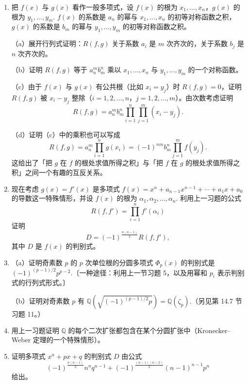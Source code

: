 \begin{enumerate}
（b）设 \(R'\) 表示 \(R\) 的代数余子式矩阵（如第 11.4 节定理 30 中那样），故 \(R'R = R(f,g)I\)，其中 \(I\) 是单位矩阵。把上面的矩阵方程两边左乘 \(R'\)，并令所得列矩阵最下面的一个分量相等，证明存在多项式 \(r(x), s(x) \in F[x]\) 使 \(R(f,g) = r(x)f(x)+s(x)g(x)\)，即两个多项式的结式是这两个多项式在 \(F[x]\) 中的线性组合。

\item 把 \(f(x)\) 与 \(g(x)\) 看作一般多项式，设 \(f(x)\) 的根为 \(x_1, \ldots, x_n\)，\(g(x)\) 的根为 \(y_1, \ldots, y_m\). \(f(x)\) 的系数是 \(a_n\) 的幂与 \(x_1, \ldots, x_n\) 的初等对称函数之积，\(g(x)\) 的系数是 \(b_m\) 的幂与 \(y_1, \ldots, y_m\) 的初等对称函数之积。

（a）展开行列式证明：\(R(f,g)\) 关于系数 \(a_i\) 是 \(m\) 次齐次的，关于系数 \(b_j\) 是 \(n\) 次齐次的。

（b）证明 \(R(f,g)\) 等于 \(a_n^mb_m^n\) 乘以 \(x_1, \ldots, x_n\) 与 \(y_1, \ldots, y_m\) 的一个对称函数。

（c）由于 \(f(x)\) 与 \(g(x)\) 有公共根（比如 \(x_i = y_j\)）时 \(R(f,g) = 0\)，证明 \(R(f,g)\) 被 \(x_i-y_j\) 整除（\(i = 1, 2, \ldots, n\)，\(j = 1, 2, \ldots, m\)）。由次数考虑证明
\[
R(f,g) = a_n^mb_m^n\prod_{i=1}^{n}\prod_{j=1}^{m}(x_i-y_j).
\]

（d）证明（c）中的乘积也可以写成
\[
R(f,g) = a_n^m\prod_{i=1}^{n}g(x_i) = (-1)^{nm}b_m^n\prod_{j=1}^{m}f(y_j).
\]
这给出了「把 \(g\) 在 \(f\) 的根处求值所得之积」与「把 \(f\) 在 \(g\) 的根处求值所得之积」之间一个有趣的互反关系。

\item 现在考虑 \(g(x) = f'(x)\) 是多项式 \(f(x) = x^n+a_{n-1}x^{n-1}+\cdots+a_1x+a_0\) 的导数这一特殊情形，并设 \(f(x)\) 的根为 \(\alpha_1, \alpha_2, \ldots, \alpha_n\). 利用上一习题的公式
\[
R(f,f') = \prod_{i=1}^{n}f'(\alpha_i)
\]
证明
\[
D = (-1)^{\frac{n(n-1)}{2}}R(f,f'),
\]
其中 \(D\) 是 \(f(x)\) 的判别式。

\item （a）证明奇素数 \(p\) 的 \(p\) 次单位根的分圆多项式 \(\Phi_p(x)\) 的判别式是 \((-1)^{(p-1)/2}p^{p-2}\).〔一种途径：利用上一节习题 5，以及用幂和 \(p_i\) 表示判别式的行列式形式。〕

（b）证明对奇素数 \(p\) 有 \(\mathbb{Q}\left(\sqrt{(-1)^{(p-1)/2}p}\right) = \mathbb{Q}(\zeta_p)\).（另见第 14.7 节习题 11。）

\item 用上一习题证明 \(\mathbb{Q}\) 的每个二次扩张都包含在某个分圆扩张中（Kronecker--Weber 定理的一个特殊情形）。

\item 证明多项式 \(x^n+px+q\) 的判别式 \(D\) 由公式
\[
(-1)^{\frac{n(n-1)}{2}}n^nq^{n-1}+(-1)^{\frac{(n-1)(n-2)}{2}}(n-1)^{n-1}p^n
\]
给出。


\end{enumerate}
